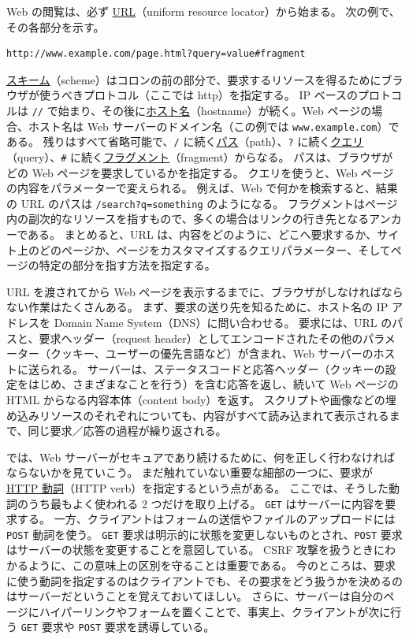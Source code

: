 \documentclass[uplatex]{jsarticle}
\begin{document}
Web の閲覧は、必ず \underline{URL}（uniform resource locator）から始まる。
次の例で、その各部分を示す。
\begin{verbatim}
http://www.example.com/page.html?query=value#fragment
\end{verbatim}
\underline{スキーム}（scheme）はコロンの前の部分で、要求するリソースを得るためにブラウザが使うべきプロトコル（ここでは http）を指定する。
IP ベースのプロトコルは \texttt{//} で始まり、その後に\underline{ホスト名}（hostname）が続く。Web ページの場合、ホスト名は Web サーバーのドメイン名（この例では \texttt{www.example.com}）である。
残りはすべて省略可能で、\texttt{/} に続く\underline{パス}（path）、\texttt{?} に続く\underline{クエリ}（query）、\texttt{\#} に続く\underline{フラグメント}（fragment）からなる。
パスは、ブラウザがどの Web ページを要求しているかを指定する。
クエリを使うと、Web ページの内容をパラメーターで変えられる。
例えば、Web で何かを検索すると、結果の URL のパスは \texttt{/search?q=something} のようになる。
フラグメントはページ内の副次的なリソースを指すもので、多くの場合はリンクの行き先となるアンカーである。
まとめると、URL は、内容をどのように、どこへ要求するか、サイト上のどのページか、ページをカスタマイズするクエリパラメーター、そしてページの特定の部分を指す方法を指定する。

URL を渡されてから Web ページを表示するまでに、ブラウザがしなければならない作業はたくさんある。
まず、要求の送り先を知るために、ホスト名の IP アドレスを Domain Name System（DNS）に問い合わせる。
要求には、URL のパスと、要求ヘッダー（request header）としてエンコードされたその他のパラメーター（クッキー、ユーザーの優先言語など）が含まれ、Web サーバーのホストに送られる。
サーバーは、ステータスコードと応答ヘッダー（クッキーの設定をはじめ、さまざまなことを行う）を含む応答を返し、続いて Web ページの HTML からなる内容本体（content body）を返す。
スクリプトや画像などの埋め込みリソースのそれぞれについても、内容がすべて読み込まれて表示されるまで、同じ要求／応答の過程が繰り返される。

では、Web サーバーがセキュアであり続けるために、何を正しく行わなければならないかを見ていこう。
まだ触れていない重要な細部の一つに、要求が \underline{HTTP 動詞}（HTTP verb）を指定するという点がある。
ここでは、そうした動詞のうち最もよく使われる 2 つだけを取り上げる。
\texttt{GET} はサーバーに内容を要求する。
一方、クライアントはフォームの送信やファイルのアップロードには \texttt{POST} 動詞を使う。
\texttt{GET} 要求は明示的に状態を変更しないものとされ、\texttt{POST} 要求はサーバーの状態を変更することを意図している。
CSRF 攻撃を扱うときにわかるように、この意味上の区別を守ることは重要である。
今のところは、要求に使う動詞を指定するのはクライアントでも、その要求をどう扱うかを決めるのはサーバーだということを覚えておいてほしい。
さらに、サーバーは自分のページにハイパーリンクやフォームを置くことで、事実上、クライアントが次に行う \texttt{GET} 要求や \texttt{POST} 要求を誘導している。
\end{document}
